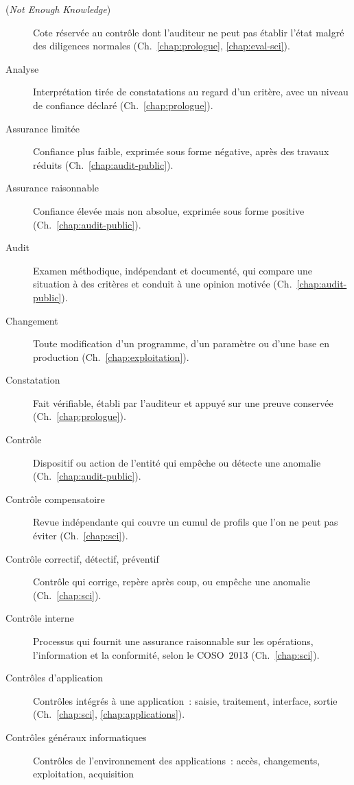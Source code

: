 \begin{description}
    \item[\NEK{} (\textit{Not Enough Knowledge})] Cote réservée au contrôle
          dont l'auditeur ne peut pas établir l'état malgré des diligences
          normales (Ch.~\ref{chap:prologue}, \ref{chap:eval-sci}).
    \item[Analyse] Interprétation tirée de constatations au regard d'un
          critère, avec un niveau de confiance déclaré
          (Ch.~\ref{chap:prologue}).
    \item[Assurance limitée] Confiance plus faible, exprimée sous forme
          négative, après des travaux réduits (Ch.~\ref{chap:audit-public}).
    \item[Assurance raisonnable] Confiance élevée mais non absolue, exprimée
          sous forme positive (Ch.~\ref{chap:audit-public}).
    \item[Audit] Examen méthodique, indépendant et documenté, qui compare
          une situation à des critères et conduit à une opinion motivée
          (Ch.~\ref{chap:audit-public}).
    \item[Changement] Toute modification d'un programme, d'un paramètre ou
          d'une base en production (Ch.~\ref{chap:exploitation}).
    \item[Constatation] Fait vérifiable, établi par l'auditeur et appuyé
          sur une preuve conservée (Ch.~\ref{chap:prologue}).
    \item[Contrôle] Dispositif ou action de l'entité qui empêche ou détecte
          une anomalie (Ch.~\ref{chap:audit-public}).
    \item[Contrôle compensatoire] Revue indépendante qui couvre un cumul de
          profils que l'on ne peut pas éviter (Ch.~\ref{chap:sci}).
    \item[Contrôle correctif, détectif, préventif] Contrôle qui corrige,
          repère après coup, ou empêche une anomalie (Ch.~\ref{chap:sci}).
    \item[Contrôle interne] Processus qui fournit une assurance raisonnable
          sur les opérations, l'information et la conformité, selon le
          COSO~2013 (Ch.~\ref{chap:sci}).
    \item[Contrôles d'application] Contrôles intégrés à une application~:
          saisie, traitement, interface, sortie (Ch.~\ref{chap:sci},
          \ref{chap:applications}).
    \item[Contrôles généraux informatiques] Contrôles de l'environnement des
          applications~: accès, changements, exploitation, acquisition

\end{description}
